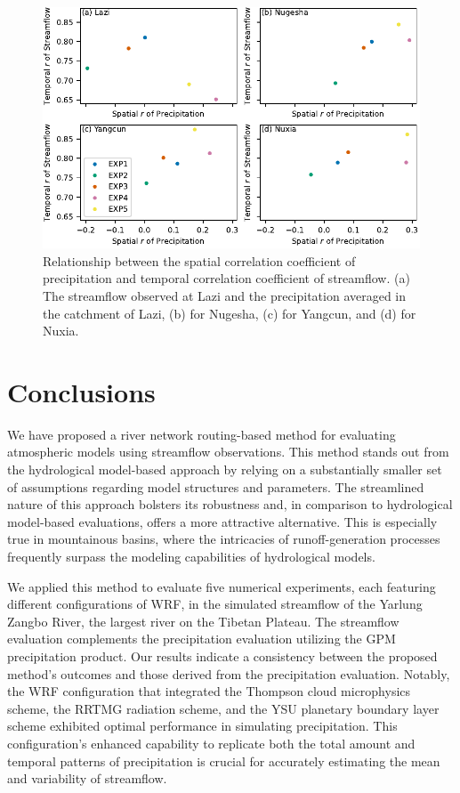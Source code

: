 \documentclass[draft]{agujournal2019}
\begin{document}
\begin{figure}[h!]
  \centering
  \noindent\includegraphics[width=140mm]{q_cc_p.pdf}
  \caption{Relationship between the spatial correlation coefficient of precipitation and temporal correlation coefficient of streamflow. (a) The streamflow observed at Lazi and the precipitation averaged in the catchment of Lazi, (b) for Nugesha, (c) for Yangcun, and (d) for Nuxia. \label{fig:q_cc_p}}
\end{figure}

\section{Conclusions}
\label{sec:conclusions}

We have proposed a river network routing-based method for evaluating atmospheric models using streamflow observations. This method stands out from the hydrological model-based approach by relying on a substantially smaller set of assumptions regarding model structures and parameters. The streamlined nature of this approach bolsters its robustness and, in comparison to hydrological model-based evaluations, offers a more attractive alternative. This is especially true in mountainous basins, where the intricacies of runoff-generation processes frequently surpass the modeling capabilities of hydrological models.

We applied this method to evaluate five numerical experiments, each featuring different configurations of WRF, in the simulated streamflow of the Yarlung Zangbo River, the largest river on the Tibetan Plateau. The streamflow evaluation complements the precipitation evaluation utilizing the GPM precipitation product. Our results indicate a consistency between the proposed method's outcomes and those derived from the precipitation evaluation. Notably, the WRF configuration that integrated the Thompson cloud microphysics scheme, the RRTMG radiation scheme, and the YSU planetary boundary layer scheme exhibited optimal performance in simulating precipitation. This configuration's enhanced capability to replicate both the total amount and temporal patterns of precipitation is crucial for accurately estimating the mean and variability of streamflow.
\end{document}
